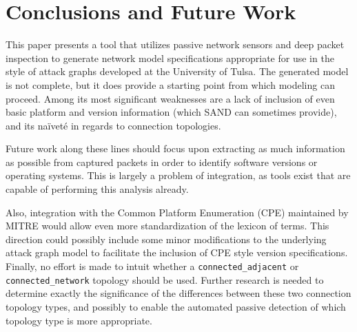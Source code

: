 \documentclass{article}
\begin{document}
\section{Conclusions and Future Work}
This paper presents a tool that utilizes passive network sensors and deep
packet inspection to generate network model specifications appropriate for use
in the style of attack graphs developed at the University of Tulsa. The
generated model is not complete, but it does provide a starting point from
which modeling can proceed. Among its most significant weaknesses are a lack
of inclusion of even basic platform and version information (which SAND
can sometimes provide), and its na\"{i}vet\'{e} in regards to connection
topologies.

Future work along these lines should focus upon extracting as much information
as possible from captured packets in order to identify software versions or
operating systems. This is largely a problem of integration, as tools exist
that are capable of performing this analysis already.

Also, integration with the Common Platform Enumeration (CPE) maintained by
MITRE would allow even more standardization of the lexicon of terms. This
direction could possibly include some minor modifications to the underlying
attack graph model to facilitate the inclusion of CPE style version 
specifications. Finally, no effort is made to intuit whether a 
\texttt{connected\_adjacent} or \texttt{connected\_network} topology should
be used. Further research is needed to determine exactly the significance of
the differences between these two connection topology types, and possibly to 
enable the automated passive detection of which topology type is more 
appropriate.


\end{document}
